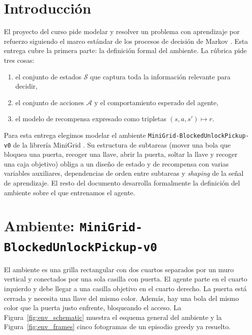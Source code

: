\documentclass[11pt,a4paper]{article}
\begin{document}
\section{Introducción}
\label{sec:intro}

El proyecto del curso pide modelar y resolver un problema con aprendizaje por
refuerzo siguiendo el marco estándar de los procesos de decisión de Markov
\cite{sutton}. Esta entrega cubre la primera parte: la definición formal del
ambiente. La rúbrica pide tres cosas:
\begin{enumerate}[leftmargin=*]
  \item el conjunto de estados \(\mathcal{S}\) que captura toda la información
        relevante para decidir,
  \item el conjunto de acciones \(\mathcal{A}\) y el comportamiento esperado
        del agente,
  \item el modelo de recompensa expresado como tripletas
        \((s, a, s')\mapsto r\).
\end{enumerate}

Para esta entrega elegimos modelar el ambiente
\texttt{MiniGrid-BlockedUnlockPickup-v0} de la librería MiniGrid
\cite{minigrid}. Su estructura de subtareas (mover una bola que bloquea una
puerta, recoger una llave, abrir la puerta, soltar la llave y recoger una
caja objetivo) obliga a un diseño de estado y de recompensa con varias
variables auxiliares, dependencias de orden entre subtareas y
\emph{shaping} de la señal de aprendizaje. El resto del documento desarrolla
formalmente la definición del ambiente sobre el que entrenamos el agente.

\section{Ambiente: \texttt{MiniGrid-BlockedUnlockPickup-v0}}
\label{sec:ambiente}

El ambiente es una grilla rectangular con dos cuartos separados por un muro
vertical y conectados por una sola casilla con puerta. El agente parte en el
cuarto izquierdo y debe llegar a una casilla objetivo en el cuarto derecho.
La puerta está cerrada y necesita una llave del mismo color. Además, hay
una bola del mismo color que la puerta justo enfrente, bloqueando el
acceso. La Figura~\ref{fig:env_schematic} muestra el esquema general del
ambiente y la Figura~\ref{fig:env_frames} cinco fotogramas de un episodio
greedy ya resuelto.
\end{document}
